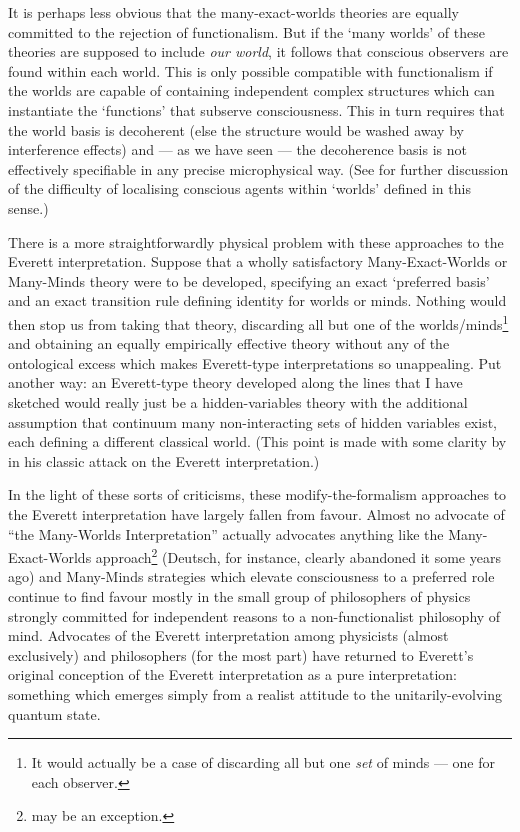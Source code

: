 \documentclass[12pt]{article}
\begin{document}
It is perhaps less obvious that the many-exact-worlds theories are equally committed to the rejection of functionalism. But
if the `many worlds' of these theories are supposed to include \emph{our world}, it follows that conscious observers are found within each world. This is only possible compatible with functionalism if the worlds are capable of containing independent complex structures which can instantiate the `functions' that subserve consciousness. This in turn requires that the world basis is decoherent (else the structure would be washed away by interference effects) and --- as we have seen --- the decoherence basis is not effectively specifiable in any precise microphysical way. (See  for further discussion of the difficulty of localising conscious agents within  `worlds' defined in this sense.)

There is a more straightforwardly physical problem with these approaches to the Everett interpretation. Suppose that a wholly satisfactory Many-Exact-Worlds or Many-Minds theory were to be developed, specifying an exact `preferred basis' and an exact transition rule defining identity for worlds or minds. Nothing would then stop us from taking that theory, discarding all but one of the worlds/minds\footnote{It would actually be a case of discarding all but one \emph{set} of minds --- one for each observer.} and obtaining an equally empirically effective theory without any of the ontological excess which makes Everett-type interpretations so unappealing. Put another way: an Everett-type theory developed along the lines that I have sketched would really just be a hidden-variables theory with the additional assumption that continuum many non-interacting sets of hidden variables exist, each defining a different classical world. (This point is made with some clarity by  in his classic attack on the Everett interpretation.) 

In the light of these sorts of criticisms, these modify-the-formalism approaches to the Everett interpretation have largely fallen from favour. Almost no advocate of ``the Many-Worlds Interpretation'' actually advocates anything like the Many-Exact-Worlds approach\footnote{ may be an exception.} (Deutsch, for instance, clearly abandoned it some years ago) and Many-Minds strategies which elevate consciousness to a preferred role continue to find favour mostly in the small group of philosophers of physics strongly committed for independent reasons to a non-functionalist philosophy of mind. Advocates of the Everett interpretation among physicists (almost exclusively) and philosophers (for the most part) have returned to Everett's original conception of the Everett interpretation as a pure interpretation: something which emerges simply from a realist attitude to the unitarily-evolving quantum state. 
\end{document}
